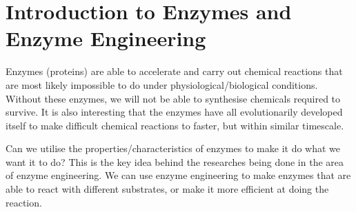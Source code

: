 \section{Introduction to Enzymes and Enzyme Engineering}

Enzymes (proteins) are able to accelerate and carry out chemical reactions that are most likely impossible to do under physiological/biological conditions.
Without these enzymes, we will not be able to synthesise chemicals required to survive.
It is also interesting that the enzymes have all evolutionarily developed itself to make difficult chemical reactions to faster, but within similar timescale.

Can we utilise the properties/characteristics of enzymes to make it do what we want it to do?
This is the key idea behind the researches being done in the area of enzyme engineering.
We can use enzyme engineering to make enzymes that are able to react with different substrates, or make it more efficient at doing the reaction.
